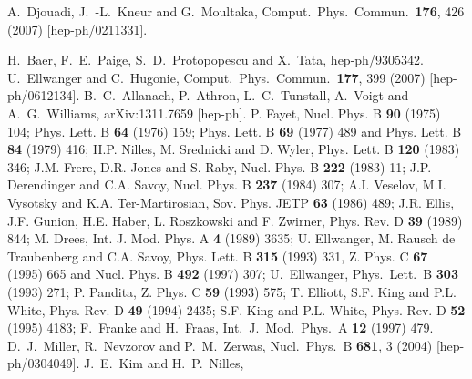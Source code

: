 \documentclass[final,3p,11pt,pdflatex]{elsarticle}
\begin{document}
\begin{thebibliography}{100}
  A.~Djouadi, J.~-L.~Kneur and G.~Moultaka,
  Comput.\ Phys.\ Commun.\  {\bf 176}, 426 (2007)
  [hep-ph/0211331].

  H.~Baer, F.~E.~Paige, S.~D.~Protopopescu and X.~Tata,
  hep-ph/9305342.
  U.~Ellwanger and C.~Hugonie,
  Comput.\ Phys.\ Commun.\  {\bf 177}, 399 (2007)
  [hep-ph/0612134].
  B.~C.~Allanach, P.~Athron, L.~C.~Tunstall, A.~Voigt and A.~G.~Williams,
  arXiv:1311.7659 [hep-ph].
 P. Fayet, Nucl. Phys. B \textbf{90} (1975) 104; Phys. Lett.
B \textbf{64} (1976) 159; Phys. Lett. B \textbf{69} (1977) 489 and Phys. Lett. B
\textbf{84} (1979) 416; H.P. Nilles, M. Srednicki and D. Wyler, Phys. Lett. B
\textbf{120} (1983) 346; J.M. Frere, D.R. Jones and S. Raby, Nucl. Phys. B
\textbf{222} (1983) 11; J.P. Derendinger and C.A. Savoy, Nucl. Phys. B
\textbf{237} (1984) 307;  A.I. Veselov, M.I. Vysotsky and K.A. Ter-Martirosian,
Sov. Phys. JETP \textbf{63} (1986) 489; J.R. Ellis, J.F. Gunion, H.E. Haber, L.
Roszkowski and F. Zwirner, Phys. Rev. D \textbf{39}  (1989) 844; M. Drees, Int.
J. Mod. Phys. A \textbf{4}  (1989) 3635; U. Ellwanger, M. Rausch de
Traubenberg and C.A. Savoy, Phys. 
Lett. B \textbf{315} (1993) 331, Z. Phys. C {\bf 67} (1995) 665 and Nucl. Phys.
B \textbf{492} (1997) 307; U.~Ellwanger, Phys.\ Lett.\  B {\bf 303} (1993) 271; P.
Pandita, Z. Phys. C \textbf{59} (1993) 575; T. Elliott, S.F. King and P.L.
White, Phys. Rev. D {\bf 49} (1994) 2435; S.F. King and P.L. White, Phys. Rev. D
\textbf{52} (1995) 4183;  F.~Franke and H.~Fraas, Int.\ J.\ Mod.\ Phys.\  A {\bf
12} (1997) 479.   D.~J.~Miller, R.~Nevzorov and P.~M.~Zerwas,  Nucl.\ Phys.\ B {\bf 681}, 3 (2004) [hep-ph/0304049].
  J.~E.~Kim and H.~P.~Nilles,

\end{thebibliography}
\end{document}
